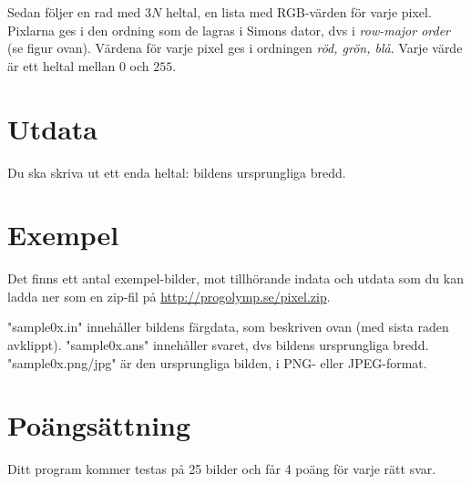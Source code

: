 Sedan följer en rad med $3N$ heltal, en lista med RGB-värden för varje pixel.
Pixlarna ges i den ordning som de lagras i Simons dator, dvs i \emph{row-major
order} (se figur ovan). Värdena för varje pixel ges i ordningen \emph{röd,
grön, blå}. Varje värde är ett heltal mellan $0$ och $255$.

\section*{Utdata}
Du ska skriva ut ett enda heltal: bildens ursprungliga bredd.

\section*{Exempel}
Det finns ett antal exempel-bilder, mot tillhörande indata och utdata som du
kan ladda ner som en zip-fil på \url{http://progolymp.se/pixel.zip}.

"sample0x.in" innehåller bildens färgdata, som beskriven ovan (med sista raden avklippt).
"sample0x.ans" innehåller svaret, dvs bildens ursprungliga bredd.
"sample0x.png/jpg" är den ursprungliga bilden, i PNG- eller JPEG-format.

\section*{Poängsättning}
Ditt program kommer testas på 25 bilder och får 4 poäng för varje rätt svar.
